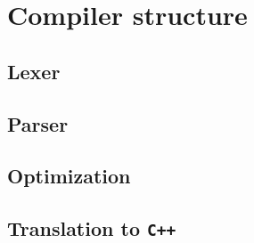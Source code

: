 \section{Compiler structure}

\subsection{Lexer}

\subsection{Parser}

\subsection{Optimization}

\subsection{Translation to \texttt{C++}}
